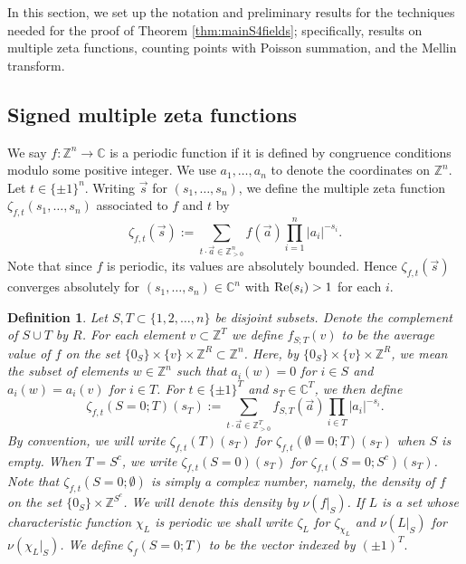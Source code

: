 \documentclass{article}
\def\Z{{\mathbb Z}}
\def\Re{{\rm Re}}
\def\Z{{\mathbb Z}}
\def\C{{\mathbb C}}
\newtheorem{definition}[theorem]{Definition}
\begin{document}
In this section, we set up the notation and preliminary results for the techniques needed for the proof of Theorem \ref{thm:mainS4fields}; specifically, results on multiple zeta functions, counting points with Poisson summation, and the Mellin transform.


\subsection{Signed multiple zeta functions}
We say $f:\Z^n\to\C$ is a periodic function if it is defined by congruence conditions modulo some positive integer. We use $a_1,\dots,a_n$ to denote the coordinates on $\Z^n$. Let $t\in\{\pm 1\}^n$. Writing $\vec{s}$ for $(s_1,\ldots,s_n)$, we define the multiple zeta function $\zeta_{f,t}(s_1,\ldots,s_n)$ associated to $f$ and $t$ by
$$\zeta_{f,t}(\vec{s}):= \sum_{t\cdot \vec{a}\in\Z_{>0}^n} f(\vec{a})\prod_{i=1}^n  |a_i|^{-s_i}.$$ 
Note that since $f$ is periodic, its values are absolutely bounded. Hence $\zeta_{f,t}(\vec{s})$ converges absolutely for $(s_1,\ldots,s_n)\in\C^n$ with $\Re(s_i)>1$ for each $i$.

\begin{definition}
Let $S,T\subset\{1,2,\dots,n\}$ be disjoint subsets. Denote the complement of $S\cup T$ by $R$.  For each element $v\subset \Z^T$ we define $f_{S;T}(v)$ to be the average value of  
$f$ on the set $\{0_S\}\times\{v\}\times\Z^R\subset\Z^n$. Here, by $\{0_S\}\times\{v\}\times\Z^R$, we mean the subset of elements $w\in\Z^n$ such that $a_i(w)=0$ for $i\in S$ and $a_i(w)=a_i(v)$ for $i\in T$. For $t\in\{\pm1\}^T$ and $s_T\in\C^T$, we then define
$$\zeta_{f,t}(S=0;T)(s_T):= \sum_{t\cdot \vec{a}\in \Z_{>0}^T} f_{S,T}(\vec{a})\prod_{i\in T} |a_i|^{-s_i}.$$ 
By convention, we will write $\zeta_{f,t}(T)(s_T)$ for $\zeta_{f,t}(\emptyset=0;T)(s_T)$ when $S$ is empty. When $T=S^c$, we write $\zeta_{f,t}(S=0)(s_T)$ for $\zeta_{f,t}(S=0;S^c)(s_T)$. Note that $\zeta_{f,t}(S=0;\emptyset)$ is simply a complex number, namely, the density of $f$ on the set $\{0_S\}\times\Z^{S^c}$. We will denote this density by $\nu(f|_S)$. If $L$ is a set whose characteristic function $\chi_L$ is periodic we shall write $\zeta_L$ for $\zeta_{\chi_L}$ and $\nu(L|_S)$ for $\nu(\chi_L|_S)$. We define $\zeta_f(S=0;T)$ to be the vector indexed by $(\pm 1)^{T}.$
\end{definition}
\end{document}
